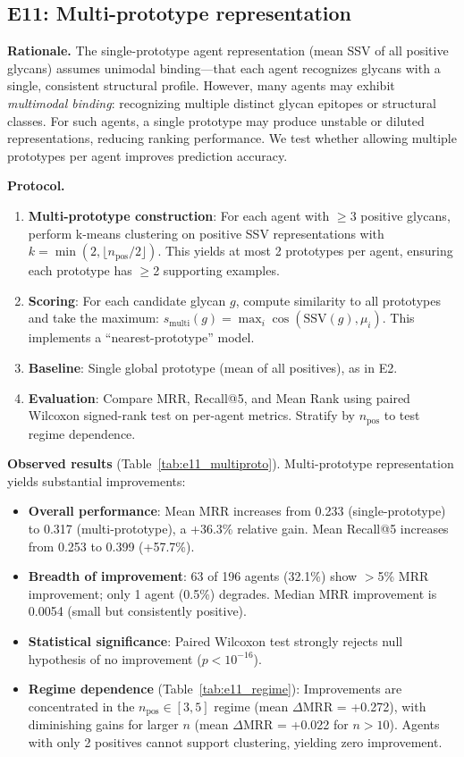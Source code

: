 \subsection{E11: Multi-prototype representation}
\label{sec:e11}

\textbf{Rationale.} The single-prototype agent representation (mean SSV of all positive glycans) assumes unimodal binding---that each agent recognizes glycans with a single, consistent structural profile. However, many agents may exhibit \emph{multimodal binding}: recognizing multiple distinct glycan epitopes or structural classes. For such agents, a single prototype may produce unstable or diluted representations, reducing ranking performance. We test whether allowing multiple prototypes per agent improves prediction accuracy.

\textbf{Protocol.}
\begin{enumerate}
\item \textbf{Multi-prototype construction}: For each agent with $\geq$3 positive glycans, perform k-means clustering on positive SSV representations with $k = \min(2, \lfloor n_{\text{pos}} / 2 \rfloor)$. This yields at most 2 prototypes per agent, ensuring each prototype has $\geq$2 supporting examples.
\item \textbf{Scoring}: For each candidate glycan $g$, compute similarity to all prototypes and take the maximum: $s_{\text{multi}}(g) = \max_i \cos(\text{SSV}(g), \mu_i)$. This implements a ``nearest-prototype'' model.
\item \textbf{Baseline}: Single global prototype (mean of all positives), as in E2.
\item \textbf{Evaluation}: Compare MRR, Recall@5, and Mean Rank using paired Wilcoxon signed-rank test on per-agent metrics. Stratify by $n_{\text{pos}}$ to test regime dependence.
\end{enumerate}

\textbf{Observed results} (Table~\ref{tab:e11_multiproto}). Multi-prototype representation yields substantial improvements:
\begin{itemize}
\item \textbf{Overall performance}: Mean MRR increases from 0.233 (single-prototype) to 0.317 (multi-prototype), a +36.3\% relative gain. Mean Recall@5 increases from 0.253 to 0.399 (+57.7\%).
\item \textbf{Breadth of improvement}: 63 of 196 agents (32.1\%) show $>$5\% MRR improvement; only 1 agent (0.5\%) degrades. Median MRR improvement is 0.0054 (small but consistently positive).
\item \textbf{Statistical significance}: Paired Wilcoxon test strongly rejects null hypothesis of no improvement ($p < 10^{-16}$).
\item \textbf{Regime dependence} (Table~\ref{tab:e11_regime}): Improvements are concentrated in the $n_{\text{pos}} \in [3, 5]$ regime (mean $\Delta$MRR = +0.272), with diminishing gains for larger $n$ (mean $\Delta$MRR = +0.022 for $n > 10$). Agents with only 2 positives cannot support clustering, yielding zero improvement.
\end{itemize}

